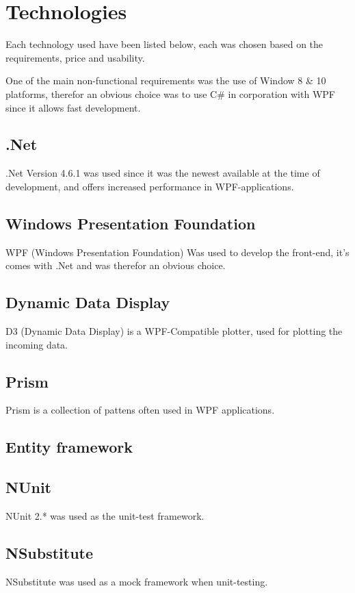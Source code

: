 \chapter{Technologies}


Each technology used have been listed below, each was chosen based on the requirements, price and usability.

One of the main non-functional requirements was the use of Window 8 \& 10 platforms, therefor an obvious choice was to use C\# in corporation with WPF since it allows fast development.

\section{.Net}

.Net Version 4.6.1 was used since it was the newest available at the time of development, and offers increased performance in WPF-applications. 

\section{Windows Presentation Foundation}

WPF (Windows Presentation Foundation) Was used to develop the front-end, it's comes with .Net and was therefor an obvious choice.

\section{Dynamic Data Display}

D3 (Dynamic Data Display) is a WPF-Compatible plotter, used for plotting the incoming data. 

\section{Prism}

Prism is a collection of pattens often used in WPF applications.

\section{Entity framework}

\section{NUnit}

NUnit 2.* was used as the unit-test framework.

\section{NSubstitute}

NSubstitute was used as a mock framework when unit-testing.